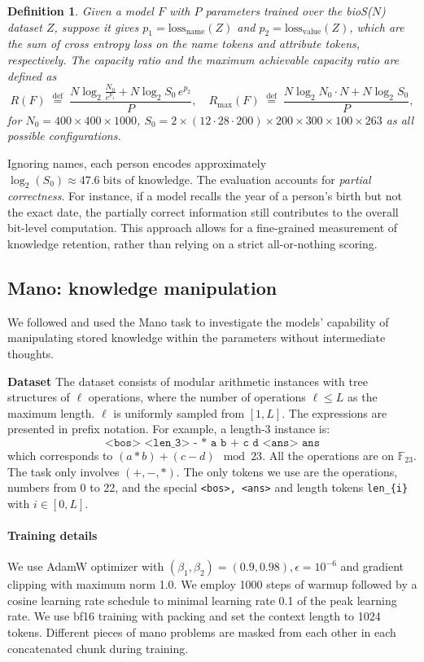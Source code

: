 \documentclass[]{bytedance_seed}
\newcommand{\1}{\mathbf{1}}
\newtheorem{definition}{Definition}
\begin{document}
{\begin{definition}
    Given a model $F$ with $P$ parameters trained over the bioS($N$) dataset $Z$, suppose it gives 
$p_1 = \text{loss}_{\text{name}}(Z)$ and $p_2 = \text{loss}_{\text{value}}(Z)$, which are the sum of cross entropy loss on the name tokens and attribute tokens, respectively.
The \emph{capacity ratio} 
and the maximum achievable capacity ratio are
 defined as
\[
R(F) \; \overset{\text{def}}{=} \; \frac{N \log_2 \frac{N_0}{e^{p_1}} + N \log_2 S_0 \, e^{p_2}}{P}, \quad R_{\max}(F) \; \overset{\text{def}}{=} \; \frac{N \log_2 N_0 \cdot N + N \log_2 S_0}{P},
\]
for 
$N_0 = 400 \times 400 \times 1000$, $S_0 = 2 \times (12 \cdot 28 \cdot 200) \times 200 \times 300 \times 100 \times 263$ as all possible configurations.
\end{definition}

Ignoring names, each person encodes approximately $\log_2(S_0) \approx 47.6 \; \text{bits of knowledge}.$ 
The evaluation accounts for \emph{partial correctness}. For instance, if a model 
recalls the year of a person’s birth but not the exact date, the partially correct information 
still contributes to the overall bit-level computation. This approach allows for a fine-grained 
measurement of knowledge retention, rather than relying on a strict all-or-nothing scoring. 


\subsection{Mano: knowledge manipulation}
\label{appendix:mano}
We followed \cite{Allenzhu2025-canon} and used the Mano task to investigate the models' capability of manipulating stored knowledge within the parameters without intermediate thoughts. 

\textbf{Dataset} The dataset consists of modular arithmetic instances with tree structures of $\ell$ operations, where the number of operations $\ell\le L$ as the maximum length. $\ell$ is uniformly sampled from $[1,L]$. The expressions are presented in prefix notation. For example, a length-3 instance is:
$$\texttt{<bos> <len\_3> - * a b + c d <ans> ans}$$
which corresponds to $(a*b)+(c-d)\mod 23$. All the operations are on $\mathbb{F}_{23}$. The task only involves $(+,-,*)$. The only tokens we use are the operations, numbers from 0 to 22, and the special \texttt{<bos>, <ans>} and length tokens \texttt{len\_\{i\}} with $i\in [0,L]$.

\paragraph{Training details} We use AdamW optimizer with $(\beta_1,\beta_2)=(0.9,0.98), \epsilon=10^{-6}$ and gradient clipping with maximum norm 1.0. We employ 1000 steps of warmup followed by a cosine learning rate schedule to minimal learning rate 0.1 of the peak learning rate. We use bf16 training with packing and set the context length to 1024 tokens. Different pieces of mano problems are masked from each other in each concatenated chunk during training.

}
\end{document}
